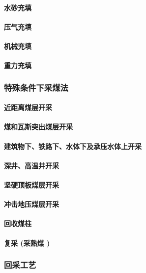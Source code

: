 \documentclass[UTF8]{../../ApplicationUniverse}
\begin{document}
            \paragraph{水砂充填}
            \paragraph{压气充填}
            \paragraph{机械充填}
            \paragraph{重力充填}
        \subsubsection{特殊条件下采煤法}
            \paragraph{近距离煤层开采}
            \paragraph{煤和瓦斯突出煤层开采}
            \paragraph{建筑物下、铁路下、水体下及承压水体上开采}
            \paragraph{深井、高温井开采}
            \paragraph{坚硬顶板煤层开采}
            \paragraph{冲击地压煤层开采}
            \paragraph{回收煤柱}
            \paragraph{复采 (采熟煤 )}
        \subsubsection{回采工艺}
\end{document}
